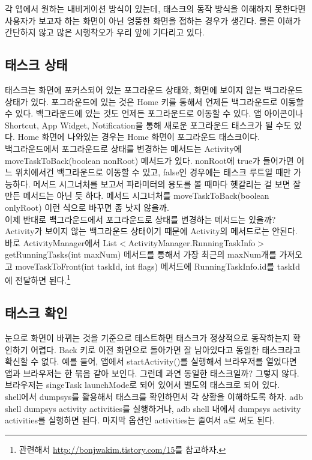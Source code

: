 각 앱에서 원하는 내비게이션 방식이 있는데, 태스크의 동작 방식을 이해하지 못한다면 사용자가 보고자 하는 화면이 아닌 엉뚱한 화면을 접하는 경우가 생긴다. 물론 이해가 간단하지 않고 많은 시행착오가 우리 앞에 기다리고 있다.

\subsection{태스크 상태}
태스크는 화면에 포커스되어 있는 포그라운드 상태와, 화면에 보이지 않는 백그라운드 상태가 있다. 포그라운드에 있는 것은 Home 키를 통해서 언제든 백그라운드로 이동할 수 있다.
백그라운드에 있는 것도 언제든 포그라운드로 이동할 수 있다. 앱 아이콘이나 Shortcut, App Widget, Notification을 통해 새로운 포그라운드 태스크가 될 수도 있다. Home 화면에 나와있는 경우는 Home 화면이 포그라운드 태스크이다.\\

백그라운드에서 포그라운드로 상태를 변경하는 메서드는 Activity에 moveTaskToBack(boolean nonRoot) 메서드가 있다. nonRoot에 true가 들어가면 어느 위치에서건 백그라운드로 이동할 수 있고, false인 경우에는 태스크 루트일 때만 가능하다. 
메서드 시그너처를 보고서 파라미터의 용도를 볼 때마다 헷갈리는 걸 보면 잘 만든 메서드는 아닌 듯 하다. 메서드 시그너처를 moveTaskToBack(boolean onlyRoot) 이런 식으로 바꾸면 좀 낫지 않을까. \\

이제 반대로 백그라운드에서 포그라운드로 상태를 변경하는 메서드는 있을까? 
Activity가 보이지 않는 백그라운드 상태이기 때문에 Activity의 메서드로는 안된다.
바로 ActivityManager에서 
List$<$ActivityManager.Running\-TaskInfo$>$ getRunningTasks(int maxNum) 메서드를 통해서 가장 최근의 maxNum개를 가져오고 moveTaskToFront(int taskId, int flags) 메서드에 RunningTaskInfo.id를 taskId에 전달하면 된다.\footnote{관련해서 \url{http://bonjwakim.tistory.com/15}를 참고하자.}

\subsection{태스크 확인}
눈으로 화면이 바뀌는 것을 기준으로 테스트하면 태스크가 정상적으로 동작하는지 확인하기 어렵다. Back 키로 이전 화면으로 돌아가면 잘 남아있다고 동일한 태스크라고 확신할 수 없다.
예를 들어, 앱에서 startActivity()를 실행해서 브라우저를 열었다면 앱과 브라우저는 한 묶음 같아 보인다. 그런데 과연 동일한 태스크일까? 그렇지 않다. 브라우저는 singeTask launchMode로 되어 있어서 별도의 태스크로 되어 있다.\\

shell에서 dumpsys를 활용해서 태스크를 확인하면서 각 상황을 이해하도록 하자.
adb shell dumpsys activity activities를 실행하거나, adb shell 내에서 dumpsys activity activities를 실행하면 된다. 마지막 옵션인 activities는 줄여서 a로 써도 된다.\\

